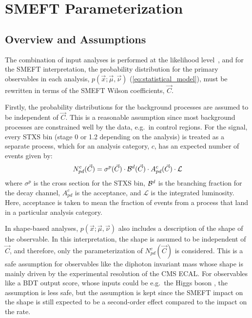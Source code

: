 \section{SMEFT Parameterization}\label{sec:eft_parameterization}

\subsection{Overview and Assumptions}

The combination of input analyses is performed at the likelihood level~\cite{CMS-PAS-HIG-21-018}, and for the SMEFT interpretation, the probability distribution for the primary observables in each analysis, $p(\vec{x};\vec{\mu},\vec{\nu})$ (\cref{eq:statistical_model}), must be rewritten in terms of the SMEFT Wilson coefficients, $\vec{C}$.

Firstly, the probability distributions for the background processes are assumed to be independent of $\vec{C}$. This is a reasonable assumption since most background processes are constrained well by the data, e.g.\ in control regions. For the signal, every STXS bin (stage 0 or 1.2 depending on the analysis) is treated as a separate process, which for an analysis category, $c$, has an expected number of events given by:
\begin{equation}
  N_{pd}^c(\vec{C}) = \sigma^p(\vec{C}) \cdot \mathcal{B}^d(\vec{C}) \cdot A_{pd}^c(\vec{C}) \cdot \mathcal{L}
  \label{eq:eft_expected_events}
\end{equation}
where $\sigma^p$ is the cross section for the STXS bin, $\mathcal{B}^d$ is the branching fraction for the decay channel, $A_{pd}^c$ is the acceptance, and $\mathcal{L}$ is the integrated luminosity. Here, acceptance is taken to mean the fraction of events from a process that land in a particular analysis category.

In shape-based analyses, $p(\vec{x};\vec{\mu},\vec{\nu})$ also includes a description of the shape of the observable. In this interpretation, the shape is assumed to be independent of $\vec{C}$, and therefore, only the parameterization of $N_{pd}^c(\vec{C})$ is considered. This is a safe assumption for observables like the diphoton invariant mass whose shape is mainly driven by the experimental resolution of the CMS ECAL. For observables like a BDT output score, whose inputs could be e.g.\ the Higgs boson \pt, the assumption is less safe, but the assumption is kept since the SMEFT impact on the shape is still expected to be a second-order effect compared to the impact on the rate.

